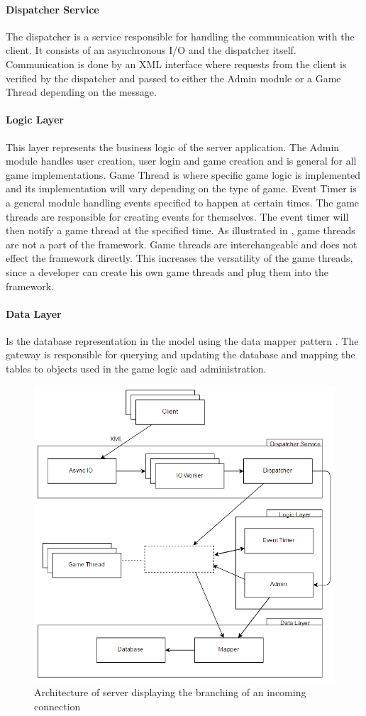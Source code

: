 \paragraph{Dispatcher Service}
The dispatcher is a service responsible for handling the communication with the client. It consists of an asynchronous I/O and the dispatcher itself. Communication is done by an XML interface where requests from the client is verified by the dispatcher and passed to either the Admin module or a Game Thread depending on the message. 

\paragraph{Logic Layer}
This layer represents the business logic of the server application. The Admin module handles user creation, user login and game creation and is general for all game implementations. Game Thread is where specific game logic is implemented and its implementation will vary depending on the type of game. Event Timer is a general module handling events specified to happen at certain times. The game threads are responsible for creating events for themselves. The event timer will then notify a game thread at the specified time. As illustrated in , game threads are not a part of the framework. Game threads are interchangeable and does not effect the framework directly. This increases the versatility of the game threads, since a developer can create his own game threads and plug them into the framework.

\paragraph{Data Layer}
Is the database representation in the model using the data mapper pattern \cite{fowler}. The gateway is responsible for querying and updating the database and mapping the tables to objects used in the game logic and administration.

\begin{figure}[H]
  \centering
  \includegraphics[width=\textwidth]{billeder/serverarch.png}  
  \caption{Architecture of server displaying the branching of an incoming connection}
  \label{fig:serverarch}
\end{figure}